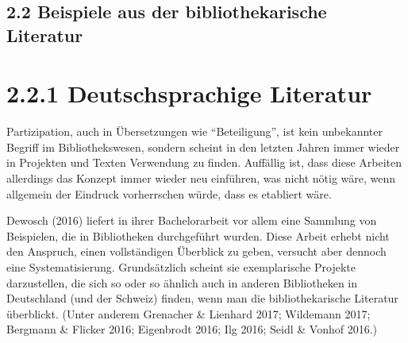 \documentclass[a4paper,
fontsize=11pt,
oneside,
numbers=noperiodatend,
parskip=half-,
bibliography=totoc,
final
]{scrartcl}
\begin{document}
\subsection{2.2 Beispiele aus der bibliothekarische
Literatur}\label{beispiele-aus-der-bibliothekarische-literatur}

\section*{2.2.1 Deutschsprachige
Literatur}\label{deutschsprachige-literatur}

Partizipation, auch in Übersetzungen wie \enquote{Beteiligung}, ist kein
unbekannter Begriff im Bibliothekswesen, sondern scheint in den letzten
Jahren immer wieder in Projekten und Texten Verwendung zu finden.
Auffällig ist, dass diese Arbeiten allerdings das Konzept immer wieder
neu einführen, was nicht nötig wäre, wenn allgemein der Eindruck
vorherrschen würde, dass es etabliert wäre.

Dewosch (2016) liefert in ihrer Bachelorarbeit vor allem eine Sammlung
von Beispielen, die in Bibliotheken durchgeführt wurden. Diese Arbeit
erhebt nicht den Anspruch, einen vollständigen Überblick zu geben,
versucht aber dennoch eine Systematisierung. Grundsätzlich scheint sie
exemplarische Projekte darzustellen, die sich so oder so ähnlich auch in
anderen Bibliotheken in Deutschland (und der Schweiz) finden, wenn man
die bibliothekarische Literatur überblickt. (Unter anderem Grenacher \&
Lienhard 2017; Wildemann 2017; Bergmann \& Flicker 2016; Eigenbrodt
2016; Ilg 2016; Seidl \& Vonhof 2016.)
\end{document}
